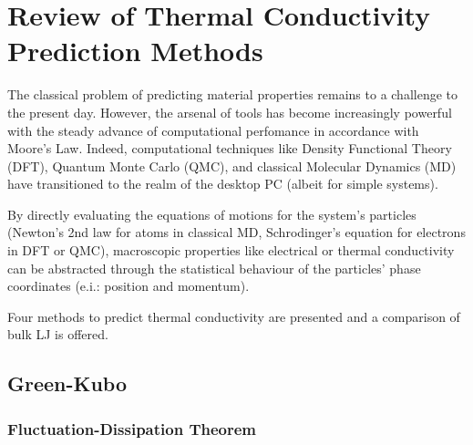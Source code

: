 \chapter{Review of Thermal Conductivity Prediction Methods}

The classical problem of predicting material properties remains to a challenge to the present day. However, the arsenal of tools has become increasingly powerful with the steady advance of computational perfomance in accordance with Moore's Law. Indeed, computational techniques like Density Functional Theory (DFT), Quantum Monte Carlo (QMC), and classical Molecular Dynamics (MD) have transitioned to the realm of the desktop PC (albeit for simple systems).

By directly evaluating the equations of motions for the system's particles (Newton's 2nd law for atoms in classical MD, Schrodinger's equation for electrons in DFT or QMC), macroscopic properties like electrical or thermal conductivity can be abstracted through the statistical behaviour of the particles' phase coordinates (e.i.: position and momentum).

Four methods to predict thermal conductivity are presented and a comparison of bulk LJ is offered.

\section{Green-Kubo}
\subsection{Fluctuation-Dissipation Theorem}

